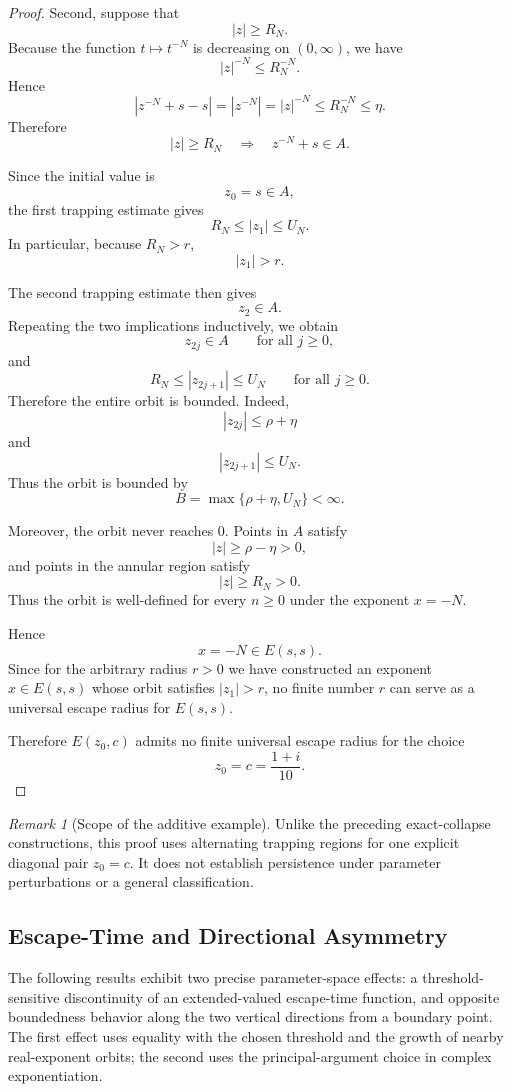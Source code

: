 \documentclass[12pt,a4paper]{amsart}
\theoremstyle{remark}
\newtheorem{remark}{Remark}[section]
\begin{document}
\begin{proof}
Second, suppose that
\[
|z|\ge R_N.
\]
Because the function $t\mapsto t^{-N}$ is decreasing on $(0,\infty)$, we have
\[
|z|^{-N}\le R_N^{-N}.
\]
Hence
\[
|z^{-N}+s-s|
=
|z^{-N}|
=
|z|^{-N}
\le
R_N^{-N}
\le
\eta.
\]
Therefore
\[
|z|\ge R_N
\quad\Longrightarrow\quad
z^{-N}+s\in A.
\]

Since the initial value is
\[
z_0=s\in A,
\]
the first trapping estimate gives
\[
R_N\le |z_1|\le U_N.
\]
In particular, because $R_N>r$,
\[
|z_1|>r.
\]

The second trapping estimate then gives
\[
z_2\in A.
\]
Repeating the two implications inductively, we obtain
\[
z_{2j}\in A
\qquad\text{for all }j\ge 0,
\]
and
\[
R_N\le |z_{2j+1}|\le U_N
\qquad\text{for all }j\ge 0.
\]
Therefore the entire orbit is bounded. Indeed,
\[
|z_{2j}|\le \rho+\eta
\]
and
\[
|z_{2j+1}|\le U_N.
\]
Thus the orbit is bounded by
\[
B=\max\{\rho+\eta,U_N\}<\infty.
\]

Moreover, the orbit never reaches $0$. Points in $A$ satisfy
\[
|z|\ge \rho-\eta>0,
\]
and points in the annular region satisfy
\[
|z|\ge R_N>0.
\]
Thus the orbit is well-defined for every $n\ge 0$ under the exponent
$x=-N$.

Hence
\[
x=-N\in E(s,s).
\]
Since for the arbitrary radius $r>0$ we have constructed an exponent
$x\in E(s,s)$ whose orbit satisfies $|z_1|>r$, no finite number $r$ can serve
as a universal escape radius for $E(s,s)$.

Therefore $E(z_0,c)$ admits no finite universal escape radius for the choice
\[
z_0=c=\frac{1+i}{10}.
\]
\end{proof}


\begin{remark}[Scope of the additive example]
Unlike the preceding exact-collapse constructions, this proof uses alternating
trapping regions for one explicit diagonal pair $z_0=c$. It does not establish
persistence under parameter perturbations or a general classification.
\end{remark}

\subsection{Escape-Time and Directional Asymmetry}

The following results exhibit two precise parameter-space effects: a
threshold-sensitive discontinuity of an extended-valued escape-time function,
and opposite boundedness behavior along the two vertical directions from a
boundary point. The first effect uses equality with the chosen threshold and
the growth of nearby real-exponent orbits; the second uses the principal-argument
choice in complex exponentiation.
\end{document}
